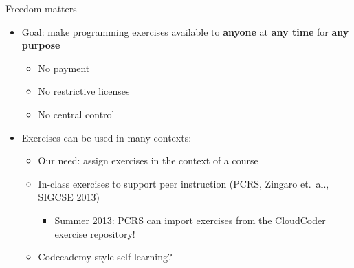 \documentclass{beamer}
\begin{document}

\begin{frame}{Freedom matters}

\begin{itemize}
  \item Goal: make programming exercises available to {\bf anyone} at {\bf any time} for {\bf any purpose}
  \begin{itemize}
    \item No payment
    \item No restrictive licenses
    \item No central control
  \end{itemize}
  \item Exercises can be used in many contexts:
  \begin{itemize}
    \item Our need: assign exercises in the context of a course
    \item In-class exercises to support peer instruction
          (PCRS, Zingaro et.\ al., SIGCSE 2013)
      \begin{itemize}
      \item Summer 2013: PCRS can import exercises from the CloudCoder exercise repository!
      \end{itemize}
    \item Codecademy-style self-learning?
  \end{itemize}
\end{itemize}

\end{frame}
\end{document}
